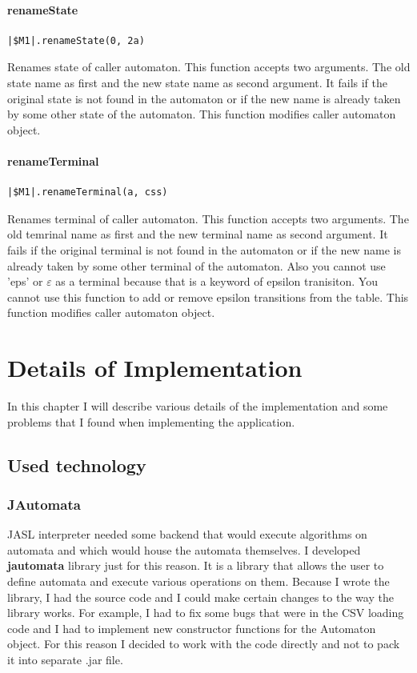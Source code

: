 \documentclass{ctuthesis}
\begin{document}
\subsubsection{renameState}
\begin{lstlisting}[language = JASL_snippet]
	|$M1|.renameState(0, 2a)
\end{lstlisting}

Renames state of caller automaton. This function accepts two arguments. The old state name as first and the new state name as second argument. It fails if the original state is not found in the automaton or if the new name is already taken by some other state of the automaton. This function modifies caller automaton object.


\subsubsection{renameTerminal}
 \begin{lstlisting}[language = JASL_snippet]
	|$M1|.renameTerminal(a, css)
\end{lstlisting}

Renames terminal of caller automaton. This function accepts two arguments. The old temrinal name as first and the new terminal name as second argument. It fails if the original terminal is not found in the automaton or if the new name is already taken by some other terminal of the automaton. Also you cannot use 'eps' or $\varepsilon$ as a terminal because that is a keyword of epsilon tranisiton. You cannot use this function to add or remove epsilon transitions from the table. This function modifies caller automaton object.

\chapter{Details of Implementation}
In this chapter I will describe various details of the implementation and some problems that I found when implementing the application.

\section{Used technology}
\subsection{JAutomata}
JASL interpreter needed some backend that would execute algorithms on automata and which would house the automata themselves. I developed \textbf{jautomata} library just for this reason. It is a library that allows the user to define automata and execute various operations on them. Because I wrote the library, I had the source code and I could make certain changes to the way the library works. For example, I had to fix some bugs that were in the CSV loading code and I had to implement new constructor functions for the Automaton object. For this reason I decided to work with the code directly and not to pack it into separate .jar file. 
\end{document}
